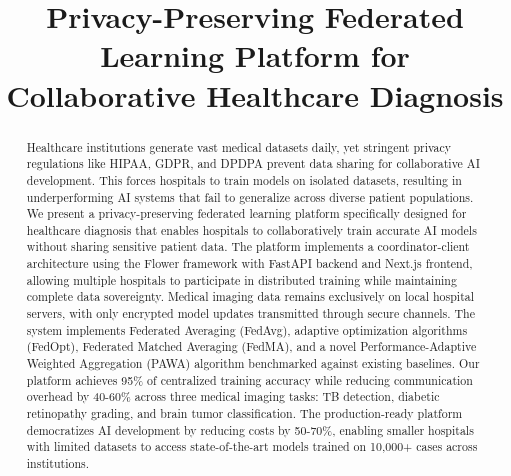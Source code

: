 \documentclass[conference]{IEEEtran}
\begin{document}
\title{Privacy-Preserving Federated Learning Platform for Collaborative Healthcare Diagnosis}

\author{
\and
{}
}

\maketitle

\begin{abstract}
Healthcare institutions generate vast medical datasets daily, yet stringent privacy regulations like HIPAA, GDPR, and DPDPA prevent data sharing for collaborative AI development. This forces hospitals to train models on isolated datasets, resulting in underperforming AI systems that fail to generalize across diverse patient populations. We present a privacy-preserving federated learning platform specifically designed for healthcare diagnosis that enables hospitals to collaboratively train accurate AI models without sharing sensitive patient data. The platform implements a coordinator-client architecture using the Flower framework with FastAPI backend and Next.js frontend, allowing multiple hospitals to participate in distributed training while maintaining complete data sovereignty. Medical imaging data remains exclusively on local hospital servers, with only encrypted model updates transmitted through secure channels. The system implements Federated Averaging (FedAvg), adaptive optimization algorithms (FedOpt), Federated Matched Averaging (FedMA), and a novel Performance-Adaptive Weighted Aggregation (PAWA) algorithm benchmarked against existing baselines. Our platform achieves 95\% of centralized training accuracy while reducing communication overhead by 40-60\% across three medical imaging tasks: TB detection, diabetic retinopathy grading, and brain tumor classification. The production-ready platform democratizes AI development by reducing costs by 50-70\%, enabling smaller hospitals with limited datasets to access state-of-the-art models trained on 10,000+ cases across institutions.
\end{abstract}
\end{document}
